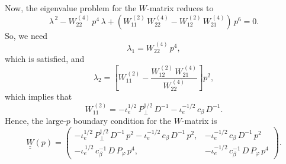 \documentclass[12pt,prb,aps,notitlepage]{revtex4-1}
\begin{document}
  Now, the eigenvalue problem for the $W$-matrix reduces to 
 \begin{equation}
 \lambda^{\,2} - W_{22}^{\,(4)}\,p^4\,\lambda + (W_{11}^{\,(2)}\,W_{22}^{\,(4)} - W_{12}^{\,(2)}\,W_{21}^{\,(4)})\,p^6 = 0.
 \end{equation}
So, we need
\begin{equation}
\lambda_1=W_{22}^{\,(4)}\,p^4,
\end{equation}
which is satisfied, and
\begin{equation}
\lambda_2 = \left[W_{11}^{\,(2)} - \frac{W_{12}^{\,(2)}\,W_{21}^{\,(4)}}{W_{22}^{\,(4)}}\right]p^2,
\end{equation}
 which implies that
 \begin{equation}
 W_{11}^{\,(2)} = -\iota_e^{1/2}\,P_\perp^{1/2}\,D^{-1}-\iota_e^{-1/2}\,c_\beta\,D^{-1}.
 \end{equation}
 Hence, the large-$p$ boundary condition for the $W$-matrix
 is
 \begin{equation}
 \underline{\underline{W}}(p) =  \left(\begin{array}{cc} -\iota_e^{1/2}\,P_\perp^{1/2}\,D^{-1}\,p^2-\iota_e^{-1/2}\,c_\beta\,D^{-1}\,p^2,& - \iota_e^{-1/2}\,c_\beta\,D^{-1}\,p^2\\-\iota_e^{\,1/2}\,c_\beta^{-1}\,D\,P_\varphi\,p^4,&-\iota_e^{-1/2}\, c_\beta^{-1}\,D\,P_\varphi\,p^4\end{array}\right).
 \end{equation}
\end{document}
